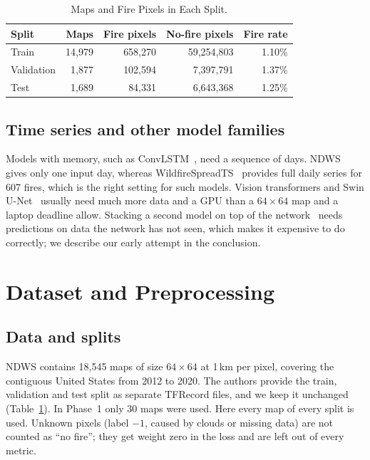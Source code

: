 \documentclass[10pt,letterpaper,twocolumn]{article}
\begin{document}
\begin{table}[!t]
\caption{Maps and Fire Pixels in Each Split.}
\label{tab:splits}
\centering
\footnotesize
\begin{tabular}{lrrrr}
\toprule
Split & Maps & Fire pixels & No-fire pixels & Fire rate \\
\midrule
Train      & 14,979 & 658,270 & 59,254,803 & 1.10\% \\
Validation &  1,877 & 102,594 &  7,397,791 & 1.37\% \\
Test       &  1,689 &  84,331 &  6,643,368 & 1.25\% \\
\bottomrule
\end{tabular}
\end{table}

\subsection{Time series and other model families}
Models with memory, such as ConvLSTM~\cite{shi2015}, need a sequence of days.
NDWS gives only one input day, whereas WildfireSpreadTS~\cite{gerard2023}
provides full daily series for 607 fires, which is the right setting for such
models. Vision transformers and Swin U-Net~\cite{dosovitskiy2021,cao2022}
usually need much more data and a GPU than a $64\times64$ map and a laptop
deadline allow. Stacking a second model on top of the network~\cite{wolpert1992}
needs predictions on data the network has not seen, which makes it expensive to
do correctly; we describe our early attempt in the conclusion.

\section{Dataset and Preprocessing}
\subsection{Data and splits}
NDWS contains 18,545 maps of size $64\times64$ at 1\,km per pixel, covering the
contiguous United States from 2012 to 2020. The authors provide the train,
validation and test split as separate TFRecord files, and we keep it unchanged
(Table~\ref{tab:splits}). In Phase~1 only 30 maps were used. Here every map of
every split is used. Unknown pixels (label $-1$, caused by clouds or missing
data) are not counted as ``no fire''; they get weight zero in the loss and are
left out of every metric.
\end{document}
